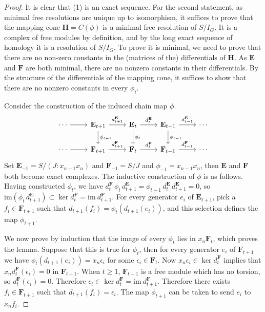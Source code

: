 \documentclass[dvipsnames,10pt]{article}
\begin{document}
\begin{proof}
    It is clear that (1) is an exact sequence. For the second statement, as minimal free resolutions are unique up to isomorphism, it suffices to prove that the mapping cone $\mathbf{H}=C(\phi)$ is a minimal free resolution of $S/I_G$. It is a complex of free modules by definition, and by the long exact sequence of homology it is a resolution of $S/I_G$. To prove it is minimal, we need to prove that there are no non-zero constants in the (matrices of the) differentials of $\mathbf{H}$. As $\mathbf{E}$ and $\mathbf{F}$ are both minimal, there are no nonzero constants in their differentials. By the structure of the differentials of the mapping cone, it suffices to show that there are no nonzero constants in every $\phi_i$.
    
    Consider the construction of the induced chain map $\phi$.
    \begin{equation*}
        \begin{tikzcd}
            \cdots \arrow[r] & \mathbf{E}_{t+1} \arrow[r, "{d_{t+1}^\mathbf{E}}"] \arrow[d,"{\phi_{t+1}}"] & \mathbf{E}_t \arrow[r, "{d_{t}^\mathbf{E}}"]\arrow[d,"{\phi_{t}}"] & \mathbf{E}_{t-1}\arrow[r, "{d_{t-1}^\mathbf{E}}"]\arrow[d,"{\phi_{t-1}}"]  & \cdots \\
            \cdots \arrow[r]  & \mathbf{F}_{t+1}\arrow[r, "{d_{t+1}^\mathbf{F}}"]  & \mathbf{F}_t \arrow[r, "{d_{t}^\mathbf{F}}"] & \mathbf{F}_{t-1}\arrow[r, "{d_{t-1}^\mathbf{F}}"]  & \cdots
        \end{tikzcd}
    \end{equation*}
    Set $\mathbf{E}_{-1}=S/(J:x_{n-1}x_n)$ and $\mathbf{F}_{-1}=S/J$ and $\phi_{-1}=x_{n-1}x_n$, then $\mathbf{E}$ and $\mathbf{F}$ both become exact complexes. The inductive construction of $\phi$ is as follows. Having constructed $\phi_t$, we have $d_t^\mathbf{F}\,\phi_t\,d_{t+1}^\mathbf{E}=\phi_{t-1}\,d_{t}^\mathbf{E}\,d_{t+1}^\mathbf{E}=0$, so $\mathrm{im}(\phi_t\,d_{t+1}^\mathbf{E})\subset \ker d_t^\mathbf{F}=\mathrm{im}\:d_{t+1}^\mathbf{F}$. For every generator $e_i$ of $\mathbf{E}_{t+1}$, pick a $f_i\in \mathbf{F}_{t+1}$ such that $d_{t+1}(f_i)=\phi_t(d_{t+1}(e_i))$, and this selection defines the map $\phi_{t+1}$.
    
    We now prove by induction that the image of every $\phi_t$ lies in $x_n\mathbf{F}_t$, which proves the lemma. Suppose that this is true for $\phi_t$, then for every generator $e_i$ of $\mathbf{F}_{t+1}$ we have $\phi_t(d_{t+1}(e_i))=x_n\epsilon_i$ for some $\epsilon_i\in \mathbf{F}_t$. Now $x_n\epsilon_i\in \ker d_{t}^\mathbf{F}$ implies that $x_nd_t^{\mathbf{F}}(\epsilon_i)=0$ in $\mathbf{F}_{t-1}$. When $t\geqslant 1$, $\mathbf{F}_{t-1}$ is a free module which has no torsion, so $d_t^{\mathbf{F}}(\epsilon_i)=0$. Therefore $\epsilon_i\in \ker d_{t}^\mathbf{F}=\mathrm{im}\: d_{t+1}^\mathbf{F}$. Therefore there exists $f_i\in \mathbf{F}_{t+1}$ such that $d_{t+1}(f_i)=\epsilon_i$. The map $\phi_{t+1}$ can be taken to send $e_i$ to $x_nf_i$.


\end{proof}
\end{document}
